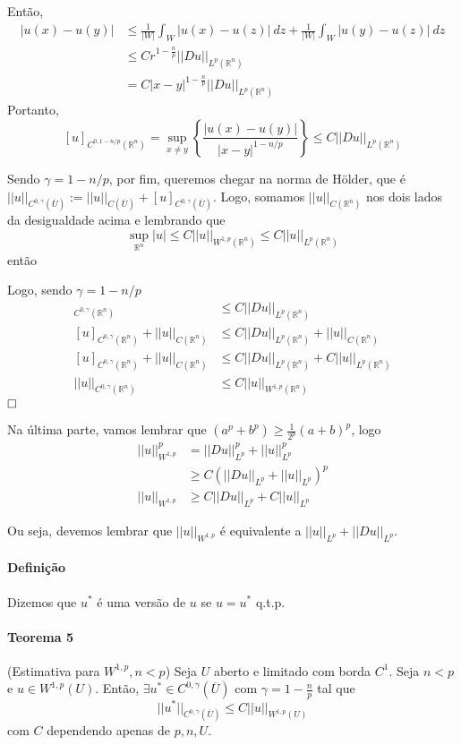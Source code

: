 \documentclass[11pt]{article}
\newcommand{\qed}{$\hfill\square$}
\newcommand{\Rn}{{\mathbb{R}^n}}
\newcommand{\rn}{{\mathbb{R}^n}}
\begin{document}
Então, \begin{align*}
	|u(x) - u(y)| &\leq \frac{1}{|W|}\int_W |u(x) -u(z)|\ dz + \frac{1}{|W|} \int_W |u(y) - u(z)| \ dz \\
	&\leq Cr^{1-\frac{n}{p}} ||Du||_{L^p(\rn)}\\
	&= C|x-y|^{1-\frac{n}{p}} ||Du||_{L^p(\rn)}
\end{align*} Portanto, \[ [u]_{C^{0, 1-n/p}(\rn)} = \sup_{x\neq y} \left\{ \frac{|u(x) - u(y)|}{|x-y|^{1-n/p}}\right\}   \leq C   ||Du||_{L^p(\rn)}    \]

Sendo $\gamma = 1 - n/p$, por fim, queremos chegar na norma de Hölder, que é $ ||u||_{C^{0,\gamma}(\overline{U})} := ||u||_{C(\overline{U})} + [u]_{C^{0,\gamma}(\overline{U})}  $. Logo, somamos $||u||_{C(\Rn)}$ nos dois lados da desigualdade acima e lembrando que \[ \sup_{\rn} |u| \leq C ||u||_{W^{1,p}(\rn)} \leq C ||u||_{L^p(\rn)}\] então

Logo, sendo $\gamma = 1 - n/p$ \begin{align*}
	[u]_{C^{0,\gamma}(\rn)}&\leq C ||Du||_{L^p(\rn)}  \\
	[u]_{C^{0,\gamma}(\rn)} + ||u||_{C(\rn)} &\leq C ||Du||_{L^p(\rn)} + ||u||_{C(\rn)} \\
	[u]_{C^{0,\gamma}(\rn)} + ||u||_{C(\rn)} &\leq C ||Du||_{L^p(\rn)} + C||u||_{L^p(\rn)} \\
	||u||_{C^{0,\gamma}(\rn)} & \leq C ||u||_{W^{1,p}(\rn)}
\end{align*}\qed

Na última parte, vamos lembrar que $ (a^p + b^p) \geq \frac{1}{2^p}(a+b)^p$, logo \begin{align*}
	||u||_{W^{1,p}}^p &= ||Du||_{L^p}^p + ||u||_{L^p}^p \\ &\geq C(||Du||_{L^p} + ||u||_{L^p}) ^p \\
	||u||_{W^{1,p}} &\geq C ||Du||_{L^p} + C ||u||_{L^p}
\end{align*}

Ou seja, devemos lembrar que $||u||_{W^{1,p}}$ é equivalente a $||u||_{L^p} + ||Du||_{L^p}$.


\paragraph{Definição} Dizemos que $u^*$ é uma versão de $u$ se $u=u^*$ q.t.p.


\paragraph{Teorema 5}\label{t:sobolev-ineq-t5} (Estimativa para \( W^{1,p}, n<p \)) Seja \(U\) aberto e limitado com borda \( C^1\). Seja \(  n<p \) e \(  u \in W^{1,p}(U)  \). Então, \(\exists u^* \in C^{0,\gamma}(\overline{U})\) com \( \gamma = 1 - \frac{n}{p}\) tal que \[ || u^* ||_{C^{0,\gamma}(\overline{U})} \leq C ||u||_{W^{1,p}(U)} \] com \(C\) dependendo apenas de \(p, n, U\).
\end{document}
